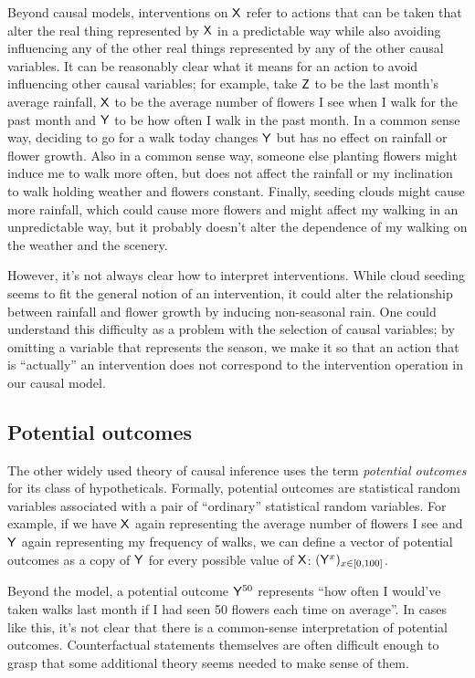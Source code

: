 Beyond causal models, interventions on $\mathsf{X}$ refer to actions that can be taken that alter the real thing represented by $\mathsf{X}$ in a predictable way while also avoiding influencing any of the other real things represented by any of the other causal variables. It can be reasonably clear what it means for an action to avoid influencing other causal variables; for example, take $\mathsf{Z}$ to be the last month's average rainfall, $\mathsf{X}$ to be the average number of flowers I see when I walk for the past month and $\mathsf{Y}$ to be how often I walk in the past month. In a common sense way, deciding to go for a walk today changes $\mathsf{Y}$ but has no effect on rainfall or flower growth. Also in a common sense way, someone else planting flowers might induce me to walk more often, but does not affect the rainfall or my inclination to walk holding weather and flowers constant. Finally, seeding clouds might cause more rainfall, which could cause more flowers and might affect my walking in an unpredictable way, but it probably doesn't alter the dependence of my walking on the weather and the scenery. 

However, it's not always clear how to interpret interventions. While cloud seeding seems to fit the general notion of an intervention, it could alter the relationship between rainfall and flower growth by inducing non-seasonal rain. One could understand this difficulty as a problem with the selection of causal variables; by omitting a variable that represents the season, we make it so that an action that is ``actually'' an intervention does not correspond to the intervention operation in our causal model.

\subsection{Potential outcomes}

The other widely used theory of causal inference uses the term \emph{potential outcomes} for its class of hypotheticals. Formally, potential outcomes are statistical random variables associated with a pair of ``ordinary'' statistical random variables. For example, if we have $\mathsf{X}$ again representing the average number of flowers I see and $\mathsf{Y}$ again representing my frequency of walks, we can define a vector of potential outcomes as a copy of $\mathsf{Y}$ for every possible value of $\mathsf{X}$: $(\mathsf{Y}^x)_{x\in [0,100]}$. 

Beyond the model, a potential outcome $\mathsf{Y}^{50}$ represents ``how often I would've taken walks last month if I had seen 50 flowers each time on average''. In cases like this, it's not clear that there is a common-sense interpretation of potential outcomes. Counterfactual statements themselves are often difficult enough to grasp that some additional theory seems needed to make sense of them.

